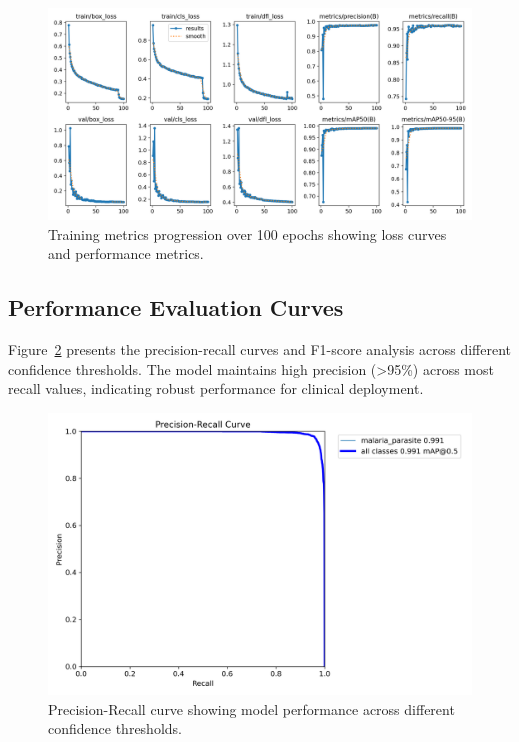 \documentclass[10pt,twocolumn]{article}
\begin{document}
\begin{figure}[H]
\centering
\includegraphics[width=\columnwidth]{malaria_detection_training_output/results/results.png}
\caption{Training metrics progression over 100 epochs showing loss curves and performance metrics.}
\label{fig:training_results}
\end{figure}

\subsection{Performance Evaluation Curves}

Figure~\ref{fig:pr_curve} presents the precision-recall curves and F1-score analysis across different confidence thresholds. The model maintains high precision (>95\%) across most recall values, indicating robust performance for clinical deployment.

\begin{figure}[H]
\centering
\includegraphics[width=\columnwidth]{malaria_detection_training_output/results/BoxPR_curve.png}
\caption{Precision-Recall curve showing model performance across different confidence thresholds.}
\label{fig:pr_curve}
\end{figure}
\end{document}

